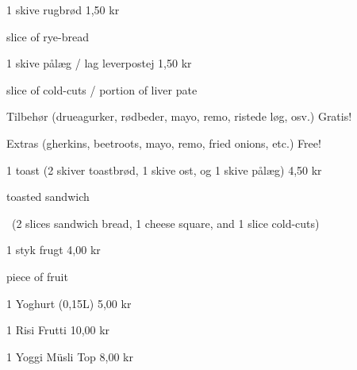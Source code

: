 \documentclass{article}
\begin{document}

\maketitle

\null
\vspace{-0.8cm}


\vspace{0.5cm}

1 skive rugbrød \hfill 1,50 kr

{ slice of rye-bread}

\vspace{0.3cm}

1 skive pålæg / lag leverpostej \hfill 1,50 kr

{ slice of cold-cuts / portion of liver pate}

\vspace{0.3cm}

Tilbehør {\large (drueagurker, rødbeder, mayo, remo, ristede løg, osv.)}
\hfill Gratis!

{\english Extras \large (gherkins, beetroots, mayo, remo, fried onions, etc.)}
\hfill  {\english Free!}

\vspace{0.3cm}

1 toast {\large (2 skiver toastbrød, 1 skive ost, og 1 skive pålæg)}
\hfill 4,50 kr

{ toasted sandwich}
\vspace{-0.1cm}

{\english\large\quad\ (2 slices sandwich bread, 1 cheese square, and 1 slice
cold-cuts)}

\vspace{0.3cm}

1 styk frugt
\hfill 4,00 kr

{ piece of fruit}

\vspace{0.3cm}

1 Yoghurt (0,15L)
\hfill 5,00 kr

\vspace{0.3cm}

1 Risi Frutti
\hfill 10,00 kr

\vspace{0.3cm}

1 Yoggi Müsli Top
\hfill 8,00 kr
\end{document}
